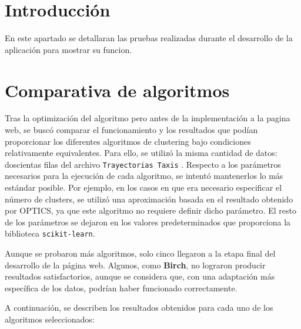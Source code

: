 
\section{Introducción}

En este apartado se detallaran las pruebas realizadas durante el desarrollo de la aplicación para mostrar su funcion.

\section{Comparativa de algoritmos}

Tras la optimización del algoritmo pero antes de la implementación a la pagina web, se buscó comparar el funcionamiento y los resultados que podían proporcionar los diferentes algoritmos de clustering bajo condiciones relativamente equivalentes. Para ello, se utilizó la misma cantidad de datos: doscientas filas del archivo \texttt{Trayectorias Taxis} \cite{trayectorias_taxis}. Respecto a los parámetros necesarios para la ejecución de cada algoritmo, se intentó mantenerlos lo más estándar posible. Por ejemplo, en los casos en que era necesario especificar el número de clusters, se utilizó una aproximación basada en el resultado obtenido por OPTICS, ya que este algoritmo no requiere definir dicho parámetro. El resto de los parámetros se dejaron en los valores predeterminados que proporciona la biblioteca \texttt{scikit-learn}.

Aunque se probaron más algoritmos, solo cinco llegaron a la etapa final del desarrollo de la página web. Algunos, como \textbf{Birch}, no lograron producir resultados satisfactorios, aunque se considera que, con una adaptación más específica de los datos, podrían haber funcionado correctamente.

A continuación, se describen los resultados obtenidos para cada uno de los algoritmos seleccionados:

